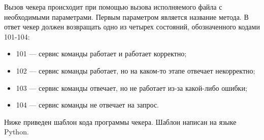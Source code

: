 Вызов чекера происходит при помощью вызова исполняемого файла с необходимыми параметрами. Первым параметром является название метода. 
В ответ чекер должен возвращать одно из четырех состояний, обозначенного кодами 101-104:
\begin{itemize}
\item 101 --- сервис команды работает и работает корректно;
\item 102 --- сервис команды работает, но на каком-то этапе отвечает некорректно;
\item 103 --- сервис команды отвечает, но не работает из-за какой-либо ошибки; 
\item 104 --- сервис команды не отвечает на запрос.
\end{itemize}


\clearpage
Ниже приведен шаблон кода программы чекера. Шаблон написан на языке Python.




\clearpage